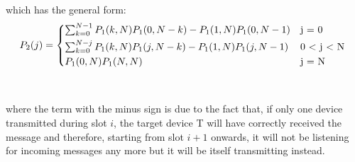 which has the general form:
  \begin{equation}\label{eq:1}
    P_{2}(j) =
    \begin{cases*}
      \sum_{k=0}^{N-1}P_{1}(k, N)P_{1}(0, N - k) - P_{1}(1, N)P_{1}(0, N-1) & j = 0 \\
      \sum_{k=0}^{N-j}P_{1}(k, N)P_{1}(j, N - k) - P_{1}(1, N)P_{1}(j, N-1) & 0 $<$ j $<$ N \\
      P_{1}(0, N)P_{1}(N, N) & j = N \\
    \end{cases*}
  \end{equation}
\\
\\
where the term with the minus sign is due to the fact that, if only one device transmitted during slot $i$, the target device T will have correctly received the message and therefore, starting from slot $i+1$ onwards, it will not be listening for incoming messages any more but it will be itself transmitting instead.\\
\\
%
%
